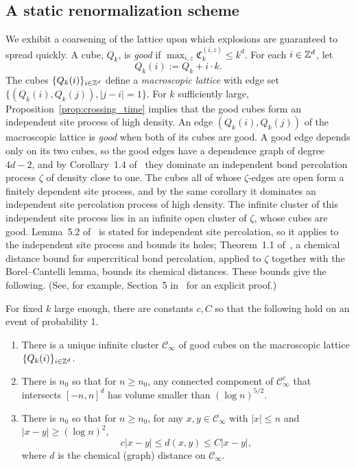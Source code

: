 \documentclass[12pt]{amsart}
\begin{document}
\subsection{A static renormalization scheme}
We exhibit a coarsening of the lattice upon which explosions are guaranteed to spread quickly. A cube, $Q_k$, is {\it good} if 
$\max_{i,z} \mathfrak{C}_{k}^{(i,z)} \leq k^d$. For each $i \in \mathbb{Z}^d$, let 
\begin{equation} 
Q_k(i) := Q_k + i \cdot k.
\end{equation}
The cubes $\{Q_k(i)\}_{i \in \mathbb{Z}^d}$ define a {\it macroscopic lattice} with edge set $\{ (Q_k(i), Q_k(j)), |j-i| = 1\}$. 
For $k$ sufficiently large, Proposition~\ref{prop:crossing_time} implies that the good cubes form an independent site process of high density. An edge $(Q_k(i),Q_k(j))$ of the macroscopic lattice is {\it good} when both of its cubes are good. A good edge depends only on its two cubes, so the good edges have a dependence graph of degree $4d-2$, and by Corollary~1.4 of~\cite{liggett1997domination} they dominate an independent bond percolation process $\zeta$ of density close to one. The cubes all of whose $\zeta$-edges are open form a finitely dependent site process, and by the same corollary it dominates an independent site percolation process of high density. The infinite cluster of this independent site process lies in an infinite open cluster of $\zeta$, whose cubes are good. Lemma~5.2 of~\cite{mathieu2008quenched} is stated for independent site percolation, so it applies to the independent site process and bounds its holes; Theorem~1.1 of~\cite{antal1996chemical}, a chemical distance bound for supercritical bond percolation, applied to $\zeta$ together with the Borel--Cantelli lemma, bounds its chemical distances. These bounds give the following. (See, for example, Section~5 in~\cite{mathieu2008quenched} for an explicit proof.)



\begin{prop} \label{prop:renormalization_properties}
	For fixed $k$ large enough, there are constants $c, C$ so that the following hold
	on an event of probability 1. 
	\begin{enumerate}
		\item There is a unique infinite cluster $\mathcal{C}_{\infty}$ of good cubes
		on the macroscopic lattice $\{Q_k(i)\}_{i \in \mathbb{Z}^d}$. 
		\item	There is $n_0$ so that for $n \geq n_0$, any connected
		component of $\mathcal{C}_{\infty}^c$ that intersects $[-n,n]^d$ has volume 
		smaller than $(\log n)^{5/2}$.
		\item   There is $n_0$ so that for $n \geq n_0$, for any $x,y \in \mathcal{C}_{\infty}$ with $|x| \leq n$ and $|x-y| \geq (\log n)^2$, 
		\[
		c |x-y| \leq d(x,y) \leq C |x-y|,  
		\] 
		where $d$ is the chemical (graph) distance on $\mathcal{C}_{\infty}$.
	\end{enumerate}
\end{prop}
\end{document}

